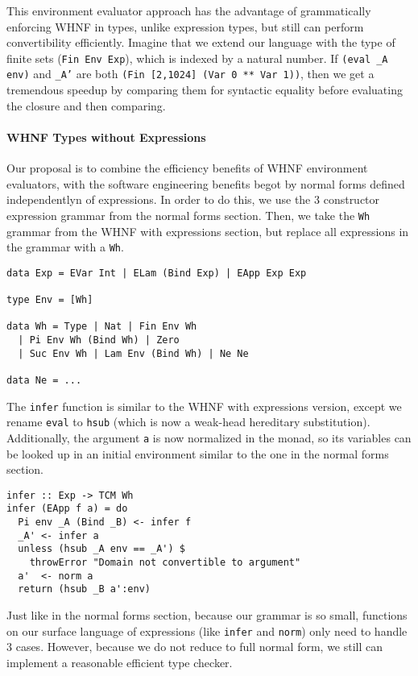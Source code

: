 \documentclass[preprint,authoryear]{sigplanconf}
\begin{document}
This environment evaluator approach has the advantage of grammatically
enforcing WHNF in types, unlike expression types, but still can
perform convertibility efficiently. Imagine that we extend our
language with the type of finite sets (\texttt{Fin Env Exp}), which is
indexed by a natural number. If \texttt{(eval \_A env)} and \texttt{\_A'}
are both \texttt{(Fin [2,1024] (Var 0 ** Var 1))}, then we get a
tremendous speedup by comparing them for syntactic equality before evaluating
the closure and then comparing.

\paragraph{WHNF Types without Expressions}

Our proposal is to combine the efficiency benefits of WHNF environment
evaluators, with the software engineering benefits begot by
normal forms defined independentlyn of expressions. In order to do
this, we use the 3 constructor expression grammar from the normal
forms section. Then, we take the \texttt{Wh} grammar from the WHNF
with expressions section, but replace all expressions in the grammar
with a \texttt{Wh}.

\begin{verbatim}
data Exp = EVar Int | ELam (Bind Exp) | EApp Exp Exp

type Env = [Wh]

data Wh = Type | Nat | Fin Env Wh
  | Pi Env Wh (Bind Wh) | Zero
  | Suc Env Wh | Lam Env (Bind Wh) | Ne Ne

data Ne = ...
\end{verbatim}

The \texttt{infer} function is similar to the WHNF with expressions
version, except we rename \texttt{eval} to \texttt{hsub} (which is now a
weak-head hereditary substitution). Additionally, the argument
\texttt{a} is now normalized in the monad, so its variables can be
looked up in an initial environment similar to the one in the normal
forms section.

\begin{verbatim}
infer :: Exp -> TCM Wh
infer (EApp f a) = do
  Pi env _A (Bind _B) <- infer f
  _A' <- infer a
  unless (hsub _A env == _A') $
    throwError "Domain not convertible to argument"
  a'  <- norm a
  return (hsub _B a':env)
\end{verbatim}

Just like in the normal forms section, because our grammar is so
small, functions on our surface language of expressions (like
\texttt{infer} and \texttt{norm}) only need to handle 3 cases.
However, because we do not reduce to full normal form, we still can
implement a reasonable efficient type checker.
\end{document}
